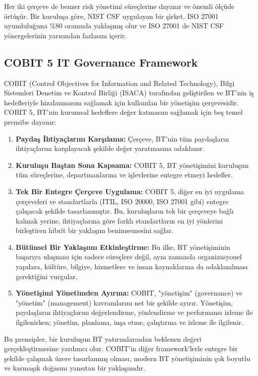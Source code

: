 Her iki çerçeve de benzer risk yönetimi süreçlerine dayanır ve önemli ölçüde örtüşür. Bir kuruluşa göre, NIST CSF uygulayan bir şirket, ISO 27001 uyumluluğuna \%80 oranında yaklaşmış olur ve ISO 27001 de NIST CSF yönergelerinin yarısından fazlasını içerir.

\subsection{COBIT 5 IT Governance Framework}

COBIT (Control Objectives for Information and Related Technology), Bilgi Sistemleri Denetim ve Kontrol Birliği (ISACA) tarafından geliştirilen ve BT'nin iş hedefleriyle hizalanmasını sağlamak için kullanılan bir yönetişim çerçevesidir. COBIT 5, BT'nin kurumsal hedeflere değer katmasını sağlamak için beş temel prensibe dayanır:

\begin{enumerate}
    \item \textbf{Paydaş İhtiyaçlarını Karşılama:} Çerçeve, BT'nin tüm paydaşların ihtiyaçlarını karşılayacak şekilde değer yaratmasına odaklanır.
    \item \textbf{Kuruluşu Baştan Sona Kapsama:} COBIT 5, BT yönetişimini kuruluşun tüm süreçlerine, departmanlarına ve işlevlerine entegre etmeyi hedefler.
    \item \textbf{Tek Bir Entegre Çerçeve Uygulama:} COBIT 5, diğer en iyi uygulama çerçeveleri ve standartlarla (ITIL, ISO 20000, ISO 27001 gibi) entegre çalışacak şekilde tasarlanmıştır. Bu, kuruluşların tek bir çerçeveye bağlı kalmak yerine, ihtiyaçlarına göre farklı standartların en iyi yönlerini birleştiren hibrit bir yaklaşım benimsemesini sağlar.
    \item \textbf{Bütünsel Bir Yaklaşımı Etkinleştirme:} Bu ilke, BT yönetişiminin başarıya ulaşması için sadece süreçlere değil, aynı zamanda organizasyonel yapılara, kültüre, bilgiye, hizmetlere ve insan kaynaklarına da odaklanılması gerektiğini vurgular.
    \item \textbf{Yönetişimi Yönetimden Ayırma:} COBIT, "yönetişim" (governance) ve "yönetim" (management) kavramlarını net bir şekilde ayırır. Yönetişim, paydaşların ihtiyaçlarını değerlendirme, yönlendirme ve performansı izleme ile ilgilenirken; yönetim, planlama, inşa etme, çalıştırma ve izleme ile ilgilenir.
\end{enumerate}

Bu prensipler, bir kuruluşun BT yatırımlarından beklenen değeri gerçekleştirmesine yardımcı olur. COBIT'in diğer framework'lerle entegre bir şekilde çalışmak üzere tasarlanmış olması, modern BT yönetişiminin çok boyutlu ve karmaşık doğasını yansıtan bir yaklaşımdır.

